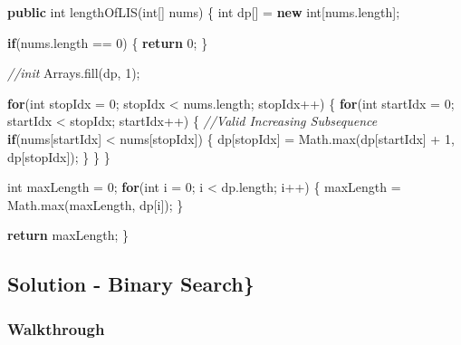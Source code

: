 \documentclass[]{book}
\newenvironment{Shaded}{\begin{snugshade}}{\end{snugshade}}
\newcommand{\BuiltInTok}[1]{#1}
\newcommand{\CommentTok}[1]{\textcolor[rgb]{0.56,0.35,0.01}{\textit{#1}}}
\newcommand{\DataTypeTok}[1]{\textcolor[rgb]{0.13,0.29,0.53}{#1}}
\newcommand{\DecValTok}[1]{\textcolor[rgb]{0.00,0.00,0.81}{#1}}
\newcommand{\FunctionTok}[1]{\textcolor[rgb]{0.00,0.00,0.00}{#1}}
\newcommand{\KeywordTok}[1]{\textcolor[rgb]{0.13,0.29,0.53}{\textbf{#1}}}
\newcommand{\NormalTok}[1]{#1}
\begin{document}
\begin{Shaded}
\begin{Highlighting}[]
\KeywordTok{public} \DataTypeTok{int} \FunctionTok{lengthOfLIS}\NormalTok{(}\DataTypeTok{int}\NormalTok{[] nums) \{}
    \DataTypeTok{int}\NormalTok{ dp[] = }\KeywordTok{new} \DataTypeTok{int}\NormalTok{[nums.}\FunctionTok{length}\NormalTok{];}

    \KeywordTok{if}\NormalTok{(nums.}\FunctionTok{length}\NormalTok{ == }\DecValTok{0}\NormalTok{) \{}
        \KeywordTok{return} \DecValTok{0}\NormalTok{;}
\NormalTok{    \}}

    \CommentTok{//init}
    \BuiltInTok{Arrays}\NormalTok{.}\FunctionTok{fill}\NormalTok{(dp, }\DecValTok{1}\NormalTok{);}

    \KeywordTok{for}\NormalTok{(}\DataTypeTok{int}\NormalTok{ stopIdx = }\DecValTok{0}\NormalTok{; stopIdx < nums.}\FunctionTok{length}\NormalTok{; stopIdx++) \{}
        \KeywordTok{for}\NormalTok{(}\DataTypeTok{int}\NormalTok{ startIdx = }\DecValTok{0}\NormalTok{; startIdx < stopIdx; startIdx++) \{}
            \CommentTok{//Valid Increasing Subsequence}
            \KeywordTok{if}\NormalTok{(nums[startIdx] < nums[stopIdx]) \{}
\NormalTok{                dp[stopIdx] = }\BuiltInTok{Math}\NormalTok{.}\FunctionTok{max}\NormalTok{(dp[startIdx] + }\DecValTok{1}\NormalTok{, dp[stopIdx]);}
\NormalTok{            \}}
\NormalTok{        \}}
\NormalTok{    \}}

    \DataTypeTok{int}\NormalTok{ maxLength = }\DecValTok{0}\NormalTok{;}
    \KeywordTok{for}\NormalTok{(}\DataTypeTok{int}\NormalTok{ i = }\DecValTok{0}\NormalTok{; i < dp.}\FunctionTok{length}\NormalTok{; i++) \{}
\NormalTok{        maxLength = }\BuiltInTok{Math}\NormalTok{.}\FunctionTok{max}\NormalTok{(maxLength, dp[i]);}
\NormalTok{    \}}

    \KeywordTok{return}\NormalTok{ maxLength;}
\NormalTok{\}}
\end{Highlighting}
\end{Shaded}

\hypertarget{solution---binary-search}{%
\subsection{Solution - Binary Search\}}\label{solution---binary-search}}

\hypertarget{walkthrough-27}{%
\subsubsection{Walkthrough}\label{walkthrough-27}}
\end{document}
